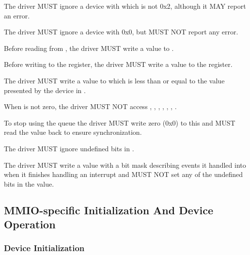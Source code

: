 The driver MUST ignore a device with  which is not 0x2,
although it MAY report an error.

The driver MUST ignore a device with  0x0,
but MUST NOT report any error.

Before reading from , the driver MUST write a value to .

Before writing to the  register, the driver MUST write a value to the  register.

The driver MUST write a value to  which is less than
or equal to the value presented by the device in .

When  is not zero, the driver MUST NOT access
, , ,
, , , .

To stop using the queue the driver MUST write zero (0x0) to this
 and MUST read the value back to ensure
synchronization.

The driver MUST ignore undefined bits in .

The driver MUST write a value with a bit mask describing events it handled into  when
it finishes handling an interrupt and MUST NOT set any of the undefined bits in the value.

\subsection{MMIO-specific Initialization And Device Operation}\label{sec:Virtio Transport Options / Virtio Over MMIO / MMIO-specific Initialization And Device Operation}

\subsubsection{Device Initialization}\label{sec:Virtio Transport Options / Virtio Over MMIO / MMIO-specific Initialization And Device Operation / Device Initialization}


